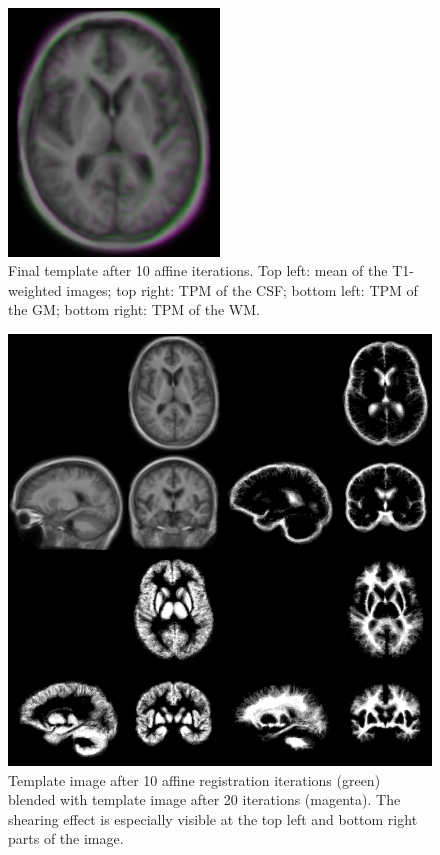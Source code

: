 \begin{figure}
  \includegraphics[width=0.5\textwidth]{figures/template_sheared}
  \centering
  \caption{Final template after 10 affine iterations. Top left: mean of the T1-weighted images; top right: TPM of the CSF; bottom left: TPM of the GM; bottom right: TPM of the WM.}
  \label{fig:template-sheared}
\end{figure}


\begin{figure}
  \includegraphics[width=\textwidth]{figures/affine_template_iter_9_collage}
  \centering
  \caption{Template image after 10 affine registration iterations (green) blended with template image after 20 iterations (magenta). The shearing effect is especially visible at the top left and bottom right parts of the image.}
  \label{fig:template-final}
\end{figure}



